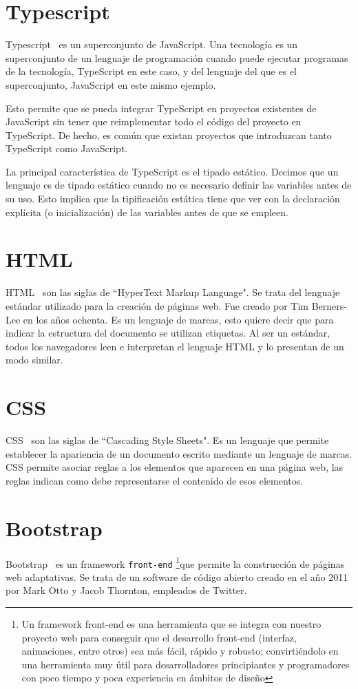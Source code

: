 \documentclass[a4paper, 12pt]{book}
\begin{document}
\section{Typescript}
\label{sec:Typescript}
Typescript~\cite{typescript}  es un superconjunto de JavaScript. Una tecnología es un superconjunto de un lenguaje de programación cuando puede ejecutar programas de la tecnología, TypeScript en este caso, y del lenguaje del que es el superconjunto, JavaScript en este mismo ejemplo.

	Esto permite que se pueda integrar TypeScript en proyectos existentes de JavaScript sin tener que reimplementar todo el código del proyecto en TypeScript. De hecho, es común que existan proyectos que introduzcan tanto TypeScript como JavaScript.
	
	La principal característica de TypeScript es el tipado estático. Decimos que un lenguaje es de tipado estático cuando no es necesario definir las variables antes de su uso. Esto implica que la tipificación estática tiene que ver con la declaración explícita (o inicialización) de las variables antes de que se empleen.


\section{HTML}
\label{sec:HTML}
HTML~\cite{HTML}  son las siglas de ``HyperText Markup Language". Se trata del lenguaje estándar utilizado para la creación de páginas web. Fue creado por Tim Berners-Lee en los años ochenta. Es un lenguaje de marcas, esto quiere decir que para indicar la estructura del documento se utilizan etiquetas. Al ser un estándar, todos los navegadores leen e interpretan el lenguaje HTML y lo presentan de un modo similar.

\clearpage

\section{CSS}
\label{sec:CSS}
CSS~\cite{CSS3} son las siglas de ``Cascading Style Sheets". Es un lenguaje que permite establecer la apariencia de un documento escrito mediante un lenguaje de marcas. CSS permite asociar reglas a los elementos que aparecen en una página web, las reglas indican como debe representarse el contenido de esos elementos.

\section{Bootstrap}
\label{sec:Bootstrap}
Bootstrap~\cite{bootstrap} es un framework \texttt{front-end} 
\footnote{Un framework front-end es una herramienta que se integra con nuestro proyecto web para conseguir que el desarrollo front-end (interfaz, animaciones, entre otros) sea más fácil, rápido y robusto; convirtiéndolo en una herramienta muy útil para desarrolladores principiantes y programadores con poco tiempo y poca experiencia en ámbitos de diseño}que permite la construcción de páginas web adaptativas. Se trata de un software de código abierto creado en el año 2011 por Mark Otto y Jacob Thornton, empleados de Twitter.
\end{document}
